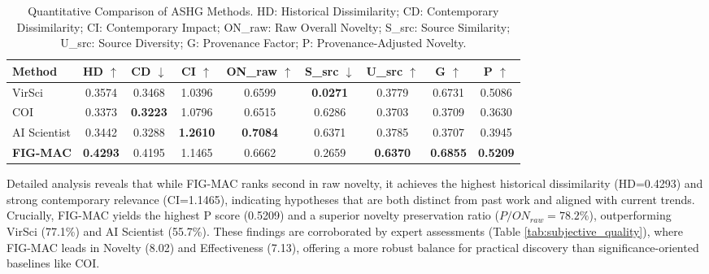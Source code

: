 \documentclass[11pt]{article}
\begin{document}
\begin{CJK}{UTF8}{gbsn}
\begin{table}[H]
\centering
\small
\setlength{\tabcolsep}{3pt}
\begin{adjustbox}{max width=\columnwidth}
\begin{tabular}{lcccccccc}
\toprule
\textbf{Method} & \textbf{HD} $\uparrow$ & \textbf{CD} $\downarrow$ & \textbf{CI} $\uparrow$ & \textbf{ON\_raw} $\uparrow$ & \textbf{S\_src} $\downarrow$ & \textbf{U\_src} $\uparrow$ & \textbf{G} $\uparrow$ & \textbf{P} $\uparrow$ \\
\midrule
VirSci & 0.3574 & 0.3468 & 1.0396 & 0.6599 & \textbf{0.0271} & 0.3779 & 0.6731 & 0.5086 \\
COI & 0.3373 & \textbf{0.3223} & 1.0796 & 0.6515 & 0.6286 & 0.3703 & 0.3709 & 0.3630 \\
AI Scientist & 0.3442 & 0.3288 & \textbf{1.2610} & \textbf{0.7084} & 0.6371 & 0.3785 & 0.3707 & 0.3945 \\
\midrule
\textbf{FIG-MAC} & \textbf{0.4293} & 0.4195 & 1.1465 & 0.6662 & 0.2659 & \textbf{0.6370} & \textbf{0.6855} & \textbf{0.5209} \\
\bottomrule
\end{tabular}
\end{adjustbox}
\caption{Quantitative Comparison of ASHG Methods. HD: Historical Dissimilarity; CD: Contemporary Dissimilarity; CI: Contemporary Impact; ON\_raw: Raw Overall Novelty; S\_src: Source Similarity; U\_src: Source Diversity; G: Provenance Factor; P: Provenance-Adjusted Novelty.}
\label{tab:main_results}
\end{table}

Detailed analysis reveals that while FIG-MAC ranks second in raw novelty, it achieves the highest historical dissimilarity (HD=0.4293) and strong contemporary relevance (CI=1.1465), indicating hypotheses that are both distinct from past work and aligned with current trends. Crucially, FIG-MAC yields the highest P score (0.5209) and a superior novelty preservation ratio ($P/ON_{raw}=78.2\%$), outperforming VirSci (77.1\%) and AI Scientist (55.7\%). These findings are corroborated by expert assessments (Table \ref{tab:subjective_quality}), where FIG-MAC leads in Novelty (8.02) and Effectiveness (7.13), offering a more robust balance for practical discovery than significance-oriented baselines like COI.


\end{CJK}
\end{document}
